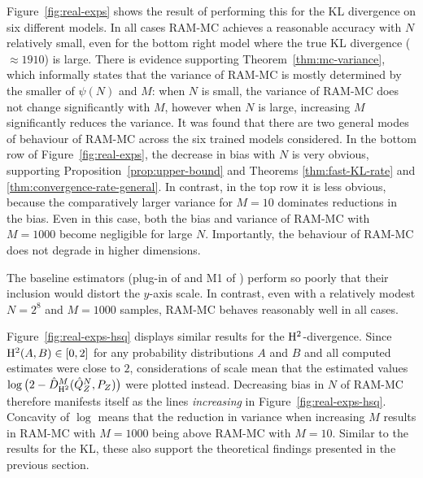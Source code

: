 Figure~\ref{fig:real-exps} shows the result of performing this for the KL divergence on six different models.
In all cases RAM-MC achieves a reasonable accuracy with $N$ relatively small, even for the bottom right model where the true KL divergence ($\approx 1910$) is large.
There is evidence supporting Theorem~\ref{thm:mc-variance}, which informally states that the variance of RAM-MC is mostly determined by the smaller of $\psi(N)$ and $M$:
when $N$ is small, the variance of RAM-MC does not change significantly with $M$, 
however when $N$ is large, increasing $M$ significantly reduces the variance. 
It was found that there are two general modes of behaviour of RAM-MC across the six trained models considered. 
In the bottom row of Figure~\ref{fig:real-exps}, the decrease in bias with $N$ is very obvious, supporting Proposition~\ref{prop:upper-bound} and Theorems \ref{thm:fast-KL-rate} and \ref{thm:convergence-rate-general}.
In contrast, in the top row it is less obvious, because the comparatively larger variance for $M{=}10$ dominates reductions in the bias.
Even in this case, both the bias and variance of RAM-MC with $M{=}1000$ become negligible for large $N$.
Importantly, the behaviour of RAM-MC does not degrade in higher dimensions.

The baseline estimators (plug-in of \cite{moon14ensemble} and M1 of \cite{nguyen10ratio}) perform so poorly that 
their inclusion would distort the $y$-axis scale.
In contrast, even with a relatively modest $N{=}2^8$ and $M{=}1000$ samples, RAM-MC behaves reasonably well in all cases.

Figure~\ref{fig:real-exps-hsq} displays similar results for the $\mathrm{H}^2$-divergence.
Since $\mathrm{H}^2(A,B) \in [0, 2]$ for any probability distributions $A$ and $B$ and all computed estimates were close to $2$,
considerations of scale mean that the estimated values $\log\big(2 - \hat{D}^M_{\mathrm{H}^2}(\hat{Q}^N_Z , P_Z)\big)$ were plotted instead.
Decreasing bias in $N$ of RAM-MC therefore manifests itself as the lines \emph{increasing} in Figure~\ref{fig:real-exps-hsq}. 
Concavity of $\log$ means that the reduction in variance when increasing $M$ results in RAM-MC with $M{=}1000$ being above RAM-MC with $M{=}10$.
Similar to the results for the KL, these also support the theoretical findings presented in the previous section.

